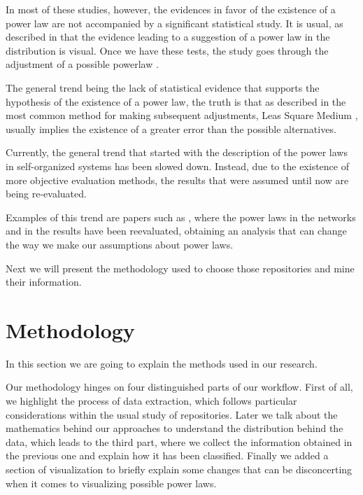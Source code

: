\documentclass[conference]{IEEEtran}
\begin{document}
In most of these studies, however, the evidences in favor of the
existence of a power law are not accompanied by a significant
statistical study. It is usual, as described in \cite{newman2005power}
that the evidence leading to a suggestion of a power law in the
distribution is visual. Once we have these tests, the study goes
through the adjustment of a possible powerlaw
\cite{merelo2017self,arafat2009commit}.

The general trend being the lack of statistical evidence that supports
the hypothesis of the existence of a power law, the truth is that as
described in \cite{newman2005power, clauset2009power} the most common
method for making subsequent adjustments, Leas Square Medium
\cite{merelo2017self,arafat2009commit,merelo16:self}, usually implies
the existence of a greater error than the possible alternatives.

Currently, the general trend that started with the description of the
power laws in self-organized systems has been slowed down. Instead,
due to the existence of more objective evaluation methods, the results
that were assumed until now are being re-evaluated.

Examples of this trend are papers such as \cite{Holme2019,
  Broido2019}, where the power laws in the networks and in the results
have been reevaluated, obtaining an analysis that can change the way
we make our assumptions about power laws.

Next we will present the methodology used to choose those repositories
and mine their information.




\section{Methodology}
\label{sec:method}

In this section we are going to explain the methods used in our
research.

Our methodology hinges on four distinguished parts of our workflow.
First of all, we highlight the process of data extraction, which
follows particular considerations within the usual study of
repositories. Later we talk about the mathematics behind our
approaches to understand the distribution behind the data, which leads
to the third part, where we collect the information obtained in the
previous one and explain how it has been classified. Finally we added
a section of visualization to briefly explain some changes that can be
disconcerting when it comes to visualizing possible power laws.
\end{document}
